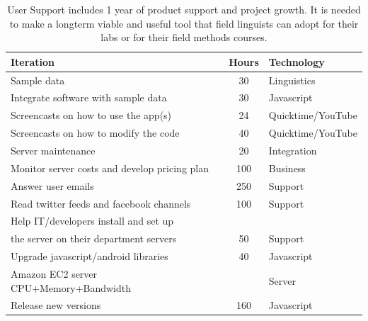 \documentclass[12pt]{article}
\begin{document}
\footnotesize
\begin{table}[htbp]
\begin{center}
  \begin{tabular}{ | lcl | }
\hline  

Iteration&  Hours&  Technology  \\
\hline
Sample data&  30& Linguistics \\ 
Integrate software with sample data&  30& Javascript\\ 
Screencasts on how to use the app(s)& 24& Quicktime/YouTube \\ 
Screencasts on how to modify the code&  40& Quicktime/YouTube \\ 
Server maintenance& 20& Integration \\ 
Monitor server costs and develop pricing plan&  100&   Business \\ 
Answer user emails& 250&  Support \\ 
Read twitter feeds and facebook channels& 100&  Support \\ 
Help IT/developers install and set up  & &\\ 
the server on their department servers& 50& Support \\ 
Upgrade javascript/android libraries& 40&  Javascript \\ 
Amazon EC2 server CPU+Memory+Bandwidth&          &  Server \\ 
Release new versions& 160&  Javascript \\ 
\hline
  \end{tabular}
 \caption{User Support includes 1 year of product support and project growth. It is needed to make a longterm viable and useful tool that field linguists can adopt for their labs or for their field methods courses.} 
  \label{tab:support}
  \end{center}
\end{table}
\end{document}
